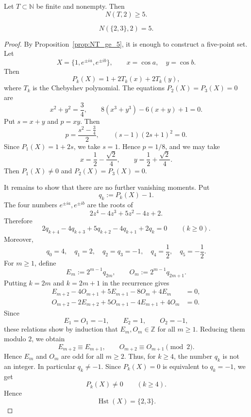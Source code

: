 \documentclass[10pt,a4paper]{amsart}
\DeclareMathOperator{\Hst}{Hst}
\newcommand{\NN}{\mathbb{N}}
\begin{document}
\begin{prop}\label{prop:NT_ge_5}
Let \(T\subset\NN\) be finite and nonempty. Then
\[
N(T,2)\ge5.
\]
\end{prop}

\begin{prop}\label{prop:23}
\[
N(\{2,3\},2)=5.
\]
\end{prop}

\begin{proof}
By Proposition~\ref{prop:NT_ge_5}, it is enough to construct a five-point
set.  Let
\[
X=\{1,e^{\pm ia},e^{\pm ib}\},
\qquad
x=\cos a,\quad y=\cos b.
\]
Then
\[
P_k(X)=1+2T_k(x)+2T_k(y),
\]
where \(T_k\) is the Chebyshev polynomial.  The equations
\(P_2(X)=P_3(X)=0\) are
\[
x^2+y^2=\frac34,
\qquad
8(x^3+y^3)-6(x+y)+1=0.
\]
Put \(s=x+y\) and \(p=xy\). Then
\[
p=\frac{s^2-\frac34}{2},
\qquad
(s-1)(2s+1)^2=0.
\]
Since \(P_1(X)=1+2s\), we take \(s=1\). Hence \(p=1/8\), and we may take
\[
x=\frac12-\frac{\sqrt2}{4},
\qquad
y=\frac12+\frac{\sqrt2}{4}.
\]
Then \(P_1(X)\neq0\) and \(P_2(X)=P_3(X)=0\).

It remains to show that there are no further vanishing moments. Put
\[
q_k:=P_k(X)-1.
\]
The four numbers \(e^{\pm ia},e^{\pm ib}\) are the roots of
\[
2z^4-4z^3+5z^2-4z+2.
\]
Therefore
\[
2q_{k+4}-4q_{k+3}+5q_{k+2}-4q_{k+1}+2q_k=0
\qquad(k\ge0).
\]
Moreover,
\[
q_0=4,\quad q_1=2,\quad q_2=q_3=-1,\quad q_4=\frac12,\quad q_5=-\frac12.
\]
For \(m\ge1\), define
\[
E_m:=2^{m-1}q_{2m},
\qquad
O_m:=2^{m-1}q_{2m+1}.
\]
Putting \(k=2m\) and \(k=2m+1\) in the recurrence gives
\begin{align*}
E_{m+2}-4O_{m+1}+5E_{m+1}-8O_m+4E_m&=0,\\
O_{m+2}-2E_{m+2}+5O_{m+1}-4E_{m+1}+4O_m&=0.
\end{align*}
Since
\[
E_1=O_1=-1,\qquad E_2=1,\qquad O_2=-1,
\]
these relations show by induction that \(E_m,O_m\in\mathbb Z\) for all
\(m\ge1\). Reducing them modulo \(2\), we obtain
\[
E_{m+2}\equiv E_{m+1},
\qquad
O_{m+2}\equiv O_{m+1}
\pmod 2.
\]
Hence \(E_m\) and \(O_m\) are odd for all \(m\ge2\).
Thus, for \(k\ge4\), the number \(q_k\) is not an integer. In particular
\(q_k\neq-1\). Since \(P_k(X)=0\) is equivalent to \(q_k=-1\), we get
\[
P_k(X)\neq0\qquad(k\ge4).
\]
Hence
\[
\Hst(X)=\{2,3\}.
\]
\end{proof}
\end{document}
